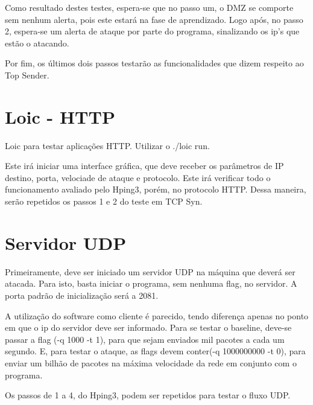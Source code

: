 Como resultado destes testes, espera-se que no passo um, o DMZ se comporte sem
nenhum alerta, pois este estará na fase de aprendizado. Logo após, no passo 2,
espera-se um alerta de ataque por parte do programa, sinalizando os ip's que estão
o atacando.

Por fim, os últimos dois passos testarão as funcionalidades que dizem respeito
ao Top Sender.

\section{Loic - HTTP}
\label{sec:Loic - HTTP}
Loic para testar aplicações HTTP. Utilizar o ./loic run.

Este irá iniciar uma interface gráfica, que deve receber os parâmetros de IP
destino, porta, velociade de ataque e protocolo. Este irá verificar todo o
funcionamento avaliado pelo Hping3, porém, no protocolo HTTP. Dessa maneira,
serão repetidos os passos 1 e 2 do teste em TCP Syn.

\section{Servidor UDP}
\label{sec:Servidor UDP}
Primeiramente, deve ser iniciado um servidor UDP na máquina que deverá ser atacada.
Para isto, basta iniciar o programa, sem nenhuma flag, no servidor. A porta
padrão de inicialização será a 2081.

A utilização do software como cliente é parecido, tendo diferença apenas no ponto
em que o ip do servidor deve ser informado. Para se testar o baseline, deve-se
passar a flag (-q 1000 -t 1), para que sejam enviados mil pacotes a cada um segundo.
E, para testar o ataque, as flags devem conter(-q 1000000000 -t 0), para enviar
um bilhão de pacotes na máxima velocidade da rede em conjunto com o programa.

Os passos de 1 a 4, do Hping3, podem ser repetidos para testar o fluxo UDP.
